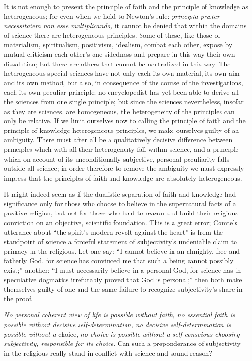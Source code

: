 \documentclass[12pt,a4paper,openany]{book}
\newcommand{\opage}[1]{\marginnote{\footnotesize\textit{[#1]}}}
\begin{document}
It is not enough to present the principle of faith and the principle of knowledge as
heterogeneous; for even when we hold to Newton's rule:
\textit{principia præter necessitatem non esse multiplicanda,}
it cannot be denied that within the domains of science there are heterogeneous
principles. Some of these, like those of materialism, spiritualism, positivism,
idealism, combat each other, expose by mutual criticism each other's one-sidedness and
prepare in this way their own dissolution; but there are others that cannot be
neutralized in this way. The heterogeneous special sciences have not only each its own
material, its own aim and its own method, but also, in consequence of the course of the
investigations, each its own peculiar principle: no encyclopedist has yet been able to
derive all the sciences from one single principle; but since the sciences nevertheless,
insofar as they are sciences, are homogeneous, the
\setcounter{footnote}{0}%
\opage{210}heterogeneity of the principles can only be relative. If we limit ourselves now to
calling the principle of faith and the principle of knowledge heterogeneous principles,
we make ourselves guilty of an ambiguity. There must after all be a qualitatively
decisive difference between principles which with all their heterogeneity fall within
science, and a principle which on account of its unconditionally subjective, personal
peculiarity falls outside all science; in order therefore to remove the ambiguity we
must expressly impress that the principles of faith and knowledge are absolutely
heterogeneous.

It might indeed seem as if the dualistic separation of faith and knowledge had
significance only for those who choose to believe in the supernatural facts of a
positive religion, but not for those who hold to reason and build their religious
conviction on an objective, scientific foundation. This is a great error; Comte's
utterance about ``the spirit's modern revolt against the heart'' is from the standpoint
of science a forceful statement of subjectivity's undeniable claim to primacy in the
religious. Let one say: ``I cannot believe in an almighty, free and fatherly God, for
science has convinced me that such a being cannot possibly exist;'' another: ``I must
necessarily believe in a personal God, for science has in speculative dogmatics
irrefutably proved that God is personal;'' then both make themselves guilty of one and
the same failure to recognize subjectivity's share in the proof.

\emph{No personal coherent view of life is possible
without faith, no essential}
\emph{faith is possible without decisive self-determination,
no decisive self-determination is}
\emph{possible without a} choice, \emph{no choice is possible without}
\emph{a self-conscious choosing subjectivity, responsible for its choice}. Can such a
preponderance of subjectivity in the religious really stand in conflict with science
and sound reason?
\end{document}
